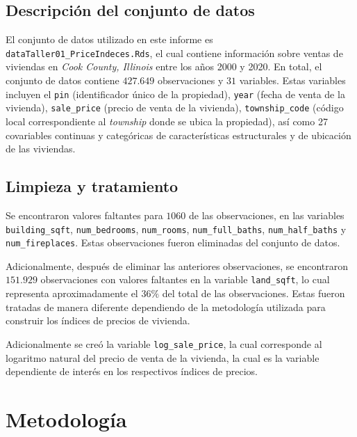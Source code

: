 \documentclass[conference]{IEEEtran}
\begin{document}
\subsection{Descripción del conjunto de datos}

El conjunto de datos utilizado en este informe es \texttt{dataTaller01\_PriceIndeces.Rds}, 
el cual contiene información sobre ventas de viviendas en \textit{Cook County, Illinois} entre los años 2000 y 2020.
En total, el conjunto de datos contiene $427.649$ observaciones y $31$ variables. Estas variables incluyen 
el \texttt{pin} (identificador único de la propiedad), \texttt{year} (fecha de venta de la vivienda),
  \texttt{sale\_price} (precio de venta de la vivienda), \texttt{township\_code} (código local correspondiente al \textit{township} donde se ubica la propiedad),
  así como 27 covariables continuas y categóricas de características estructurales y de ubicación de las viviendas.

\subsection{Limpieza y tratamiento}

Se encontraron valores faltantes para $1060$ de las observaciones, en las variables 
\texttt{building\_sqft}, \texttt{num\_bedrooms}, \texttt{num\_rooms}, \texttt{num\_full\_baths},
\texttt{num\_half\_baths} y \texttt{num\_fireplaces}. Estas observaciones fueron eliminadas del conjunto de datos.

Adicionalmente, después de eliminar las anteriores observaciones, se encontraron $151.929$ observaciones con 
valores faltantes en la variable \texttt{land\_sqft}, lo cual representa aproximadamente el $36\%$ del total de las observaciones.
Estas fueron tratadas de manera diferente dependiendo de la metodología utilizada para construir los índices de precios de vivienda.

Adicionalmente se creó la variable \texttt{log\_sale\_price}, la cual corresponde al logaritmo natural del precio de venta de la vivienda, la 
cual es la variable dependiente de interés en los respectivos índices de precios.

\section{Metodología}
\end{document}
